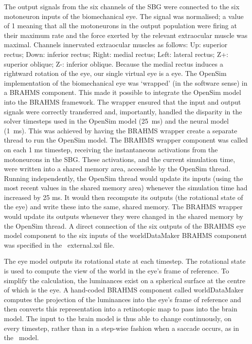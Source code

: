 \documentclass{frontiersSCNS}
\begin{document}
The output signals from the six channels of the SBG were connected to
the six motoneuron inputs of the biomechanical eye. The signal was
normalised; a value of 1 meaning that all the motoneurons in the
output population were firing at their maximum rate and the force
exerted by the relevant extraocular muscle was maximal. Channels
innervated extraocular muscles as follows: Up: superior rectus; Down:
inferior rectus; Right: medial rectus; Left: lateral rectus; Z+:
superior oblique; Z-: inferior oblique. Because the medial rectus
induces a rightward rotation of the eye, our single virtual eye is
a  eye. The OpenSim implementation of the biomechanical eye
was `wrapped' (in the software sense) in a BRAHMS component. This made
it possible to integrate the OpenSim model into the BRAHMS
framework. The wrapper ensured that the input and output signals were
correctly transferred and, importantly, handled the disparity in the
solver timesteps used in the OpenSim model (25~ms) and the neural
model (1~ms). This was achieved by having the BRAHMS wrapper create a
separate thread to run the OpenSim model. The BRAHMS wrapper component
was called on each 1 ms timestep, receiving the instantaneous
activations from the motoneurons in the SBG. These activations, and
the current simulation time, were written into a shared memory area,
accessible by the OpenSim thread. Running independently, the OpenSim
thread would update its inputs (using the most recent values in the
shared memory area) whenever the simulation time had increased by 25
ms. It would then recompute its outputs (the rotational state of the
eye) and write these into the same, shared memory. The BRAHMS wrapper
would update its outputs whenever they were changed in the shared
memory by the OpenSim thread. A direct connection of the six outputs
of the BRAHMS eye model component to the six inputs of the
worldDataMaker BRAHMS component was specified in
the \stob~external.xsl file.

The eye model outputs its rotational state at each
timestep. The rotational state is used to compute the view of the
world in the eye's frame of reference. To simplify
the calculation, the luminances exist on a spherical surface at the
centre of which is the eye. A hand-coded BRAHMS component called
worldDataMaker computes the projection of the luminances into the
eye's frame of reference and then converts this representation into a
retinotopic map to pass into the brain model. The input to the brain
model is thus able to change continuously, on every timestep, rather
than in a step-wise fashion when a saccade occurs, as in the \ccg~model.
\end{document}
